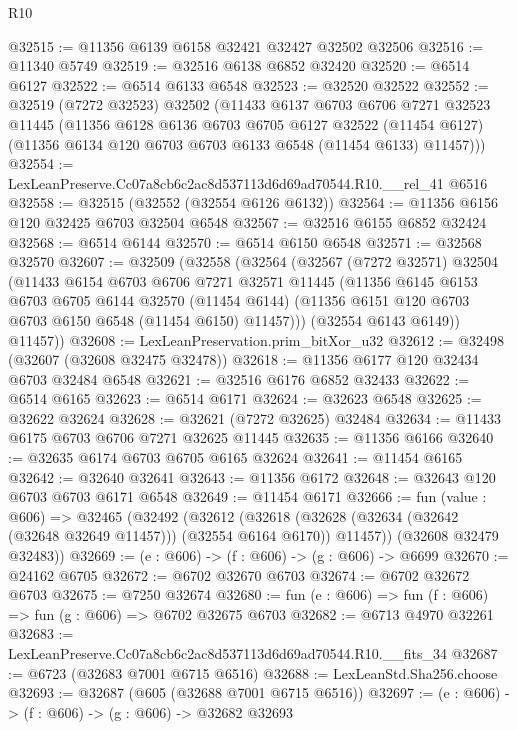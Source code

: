 \begin{lexlean}{R10}
\begin{coremodule}
@32515 := @11356 @6139 @6158 @32421 @32427 @32502 @32506
@32516 := @11340 @5749
@32519 := @32516 @6138 @6852 @32420
@32520 := @6514 @6127
@32522 := @6514 @6133 @6548
@32523 := @32520 @32522
@32552 := @32519
    (@7272 @32523)
    @32502
    (@11433
      @6137
      @6703
      @6706
      @7271
      @32523
      @11445
      (@11356
        @6128
        @6136
        @6703
        @6705
        @6127
        @32522
        (@11454 @6127)
        (@11356 @6134 @120 @6703 @6703 @6133 @6548 (@11454 @6133) @11457)))
@32554 := LexLeanPreserve.Cc07a8cb6c2ac8d537113d6d69ad70544.R10.__rel_41 @6516
@32558 := @32515 (@32552 (@32554 @6126 @6132))
@32564 := @11356 @6156 @120 @32425 @6703 @32504 @6548
@32567 := @32516 @6155 @6852 @32424
@32568 := @6514 @6144
@32570 := @6514 @6150 @6548
@32571 := @32568 @32570
@32607 := @32509
    (@32558
      (@32564
        (@32567
          (@7272 @32571)
          @32504
          (@11433
            @6154
            @6703
            @6706
            @7271
            @32571
            @11445
            (@11356
              @6145
              @6153
              @6703
              @6705
              @6144
              @32570
              (@11454 @6144)
              (@11356 @6151 @120 @6703 @6703 @6150 @6548 (@11454 @6150) @11457)))
          (@32554 @6143 @6149))
        @11457))
@32608 := LexLeanPreservation.prim_bitXor_u32
@32612 := @32498 (@32607 (@32608 @32475 @32478))
@32618 := @11356 @6177 @120 @32434 @6703 @32484 @6548
@32621 := @32516 @6176 @6852 @32433
@32622 := @6514 @6165
@32623 := @6514 @6171
@32624 := @32623 @6548
@32625 := @32622 @32624
@32628 := @32621 (@7272 @32625) @32484
@32634 := @11433 @6175 @6703 @6706 @7271 @32625 @11445
@32635 := @11356 @6166
@32640 := @32635 @6174 @6703 @6705 @6165 @32624
@32641 := @11454 @6165
@32642 := @32640 @32641
@32643 := @11356 @6172
@32648 := @32643 @120 @6703 @6703 @6171 @6548
@32649 := @11454 @6171
@32666 := fun (value : @606) =>
  @32465
    (@32492
      (@32612
        (@32618 (@32628 (@32634 (@32642 (@32648 @32649 @11457))) (@32554 @6164 @6170)) @11457))
      (@32608 @32479 @32483))
@32669 := (e : @606) -> (f : @606) -> (g : @606) -> @6699
@32670 := @24162 @6705
@32672 := @6702 @32670 @6703
@32674 := @6702 @32672 @6703
@32675 := @7250 @32674
@32680 := fun (e : @606) => fun (f : @606) => fun (g : @606) => @6702 @32675 @6703
@32682 := @6713 @4970 @32261
@32683 := LexLeanPreserve.Cc07a8cb6c2ac8d537113d6d69ad70544.R10.__fits_34
@32687 := @6723 (@32683 @7001 @6715 @6516)
@32688 := LexLeanStd.Sha256.choose
@32693 := @32687 (@605 (@32688 @7001 @6715 @6516))
@32697 := (e : @606) -> (f : @606) -> (g : @606) -> @32682 @32693

\end{coremodule}
\end{lexlean}
